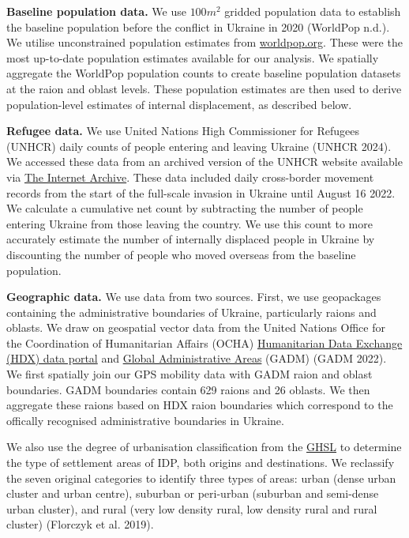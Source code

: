 \documentclass[
  sn-nature,
  11pt,
]{sn-jnl}
\begin{document}
\textbf{Baseline population data.} We use \(100m^{2}\) gridded
population data to establish the baseline population before the conflict
in Ukraine in 2020 (WorldPop n.d.). We utilise unconstrained population
estimates from \href{https://www.worldpop.org/}{worldpop.org}. These
were the most up-to-date population estimates available for our
analysis. We spatially aggregate the WorldPop population counts to
create baseline population datasets at the raion and oblast levels.
These population estimates are then used to derive population-level
estimates of internal displacement, as described below.

\textbf{Refugee data.} We use United Nations High Commissioner for
Refugees (UNHCR) daily counts of people entering and leaving Ukraine
(UNHCR 2024). We accessed these data from an archived version of the
UNHCR website available via \href{https://web.archive.org/}{The Internet
Archive}. These data included daily cross-border movement records from
the start of the full-scale invasion in Ukraine until August 16 2022. We
calculate a cumulative net count by subtracting the number of people
entering Ukraine from those leaving the country. We use this count to
more accurately estimate the number of internally displaced people in
Ukraine by discounting the number of people who moved overseas from the
baseline population.

\textbf{Geographic data.} We use data from two sources. First, we use
geopackages containing the administrative boundaries of Ukraine,
particularly raions and oblasts. We draw on geospatial vector data from
the United Nations Office for the Coordination of Humanitarian Affairs
(OCHA) \href{https://data.humdata.org/dataset?}{Humanitarian Data
Exchange (HDX) data portal} and \href{https://gadm.org/}{Global
Administrative Areas} (GADM) (GADM 2022). We first spatially join our
GPS mobility data with GADM raion and oblast boundaries. GADM boundaries
contain 629 raions and 26 oblasts. We then aggregate these raions based
on HDX raion boundaries which correspond to the offically recognised
administrative boundaries in Ukraine.

We also use the degree of urbanisation classification from the
\href{https://human-settlement.emergency.copernicus.eu/}{GHSL} to
determine the type of settlement areas of IDP, both origins and
destinations. We reclassify the seven original categories to identify
three types of areas: urban (dense urban cluster and urban centre),
suburban or peri-urban (suburban and semi-dense urban cluster), and
rural (very low density rural, low density rural and rural cluster)
(Florczyk et al. 2019).
\end{document}
